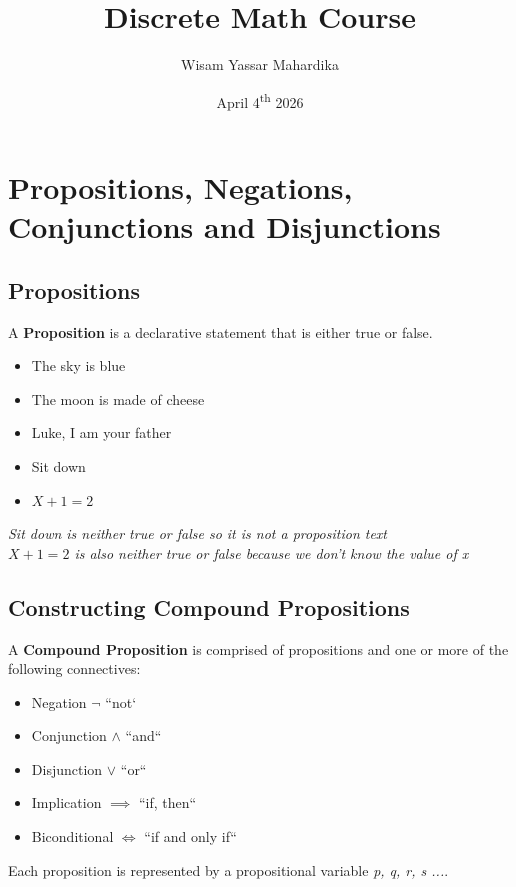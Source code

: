 \documentclass{article}
\title{Discrete Math Course}
\author{Wisam Yassar Mahardika}
\date{April 4\textsuperscript{th} 2026}
\begin{document}
\maketitle
\clearpage
\tableofcontents
\clearpage
\section{Propositions, Negations, Conjunctions and Disjunctions}
\subsection{Propositions}
A \textbf{Proposition} is a declarative statement that is either true or false.
\begin{itemize}
\item The sky is blue
\item The moon is made of cheese
\item Luke, I am your father
\item Sit down
\item $ X + 1 = 2 $ \\
\end{itemize}

 \textit{Sit down is neither true or false so it is not a proposition text} \\
\textit{$ X + 1 = 2 $ is also neither true or false because we don't know the value of x}
\\

\subsection{Constructing Compound Propositions}
A \textbf{Compound Proposition} is comprised of propositions and one or more of the following connectives:
\\


\begin{itemize}
\item Negation $ \neg $ ``not`
\item Conjunction $ \land $     ``and``
\item Disjunction $ \lor $ ``or``
\item Implication $ \implies $ ``if, then``
\item Biconditional $ \Longleftrightarrow{} $ ``if and only if``\\
\end{itemize}

Each proposition is represented by a propositional variable \textit{p, q, r, s ...}.\\
\end{document}
